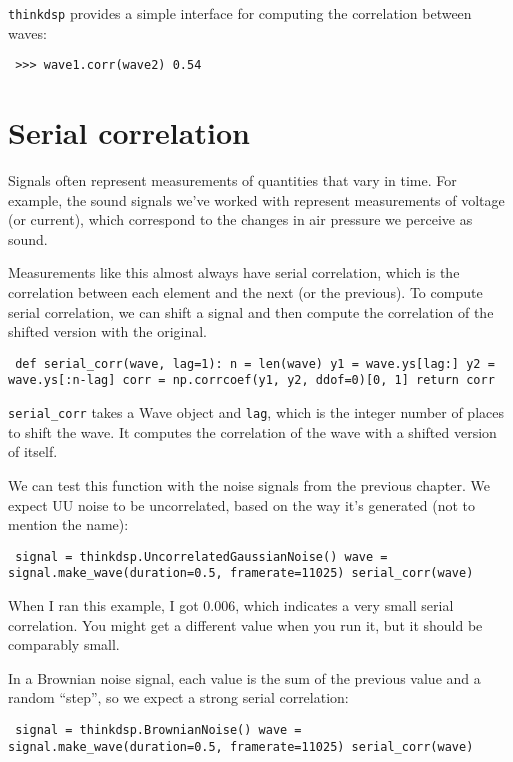 \documentclass[12pt]{book} \usepackage[width=5.5in,height=8.5in, hmarginratio=3:2,vmarginratio=1:1]{geometry}
\begin{document}
{\tt thinkdsp} provides a simple interface for computing the correlation between waves: 

\begin{verbatim} >>> wave1.corr(wave2) 0.54 \end{verbatim} 

\section{Serial correlation} 

Signals often represent measurements of quantities that vary in time. For example, the sound signals we've worked with represent measurements of voltage (or current), which correspond to the changes in air pressure we perceive as sound. 

Measurements like this almost always have serial correlation, which is the correlation between each element and the next (or the previous). To compute serial correlation, we can shift a signal and then compute the correlation of the shifted version with the original. 

\begin{verbatim} def serial_corr(wave, lag=1): n = len(wave) y1 = wave.ys[lag:] y2 = wave.ys[:n-lag] corr = np.corrcoef(y1, y2, ddof=0)[0, 1] return corr \end{verbatim} 

\verb"serial_corr" takes a Wave object and {\tt lag}, which is the integer number of places to shift the wave. It computes the correlation of the wave with a shifted version of itself. 

We can test this function with the noise signals from the previous chapter. We expect UU noise to be uncorrelated, based on the way it's generated (not to mention the name): 

\begin{verbatim} signal = thinkdsp.UncorrelatedGaussianNoise() wave = signal.make_wave(duration=0.5, framerate=11025) serial_corr(wave) \end{verbatim} 

When I ran this example, I got 0.006, which indicates a very small serial correlation. You might get a different value when you run it, but it should be comparably small. 

In a Brownian noise signal, each value is the sum of the previous value and a random ``step'', so we expect a strong serial correlation: 

\begin{verbatim} signal = thinkdsp.BrownianNoise() wave = signal.make_wave(duration=0.5, framerate=11025) serial_corr(wave) \end{verbatim} 
\end{document}
